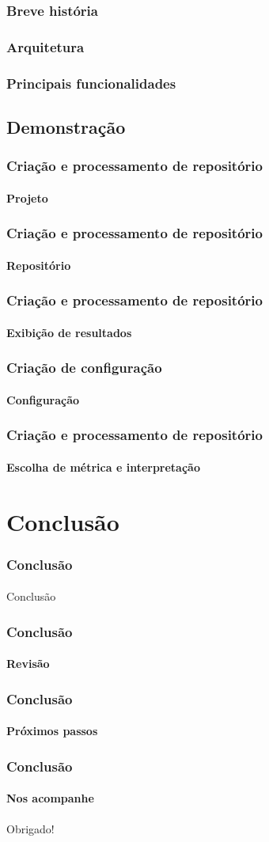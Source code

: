 \documentclass{beamer}
\begin{document}
\begin{frame}
  \frametitle{Breve história}
  \framesubtitle{}
\end{frame}

\begin{frame}
  \frametitle{Arquitetura}
  \framesubtitle{}
\end{frame}

\begin{frame}
  \frametitle{Principais funcionalidades}
  \framesubtitle{}
\end{frame}

  \subsection{Demonstração}
  \begin{frame}
    \frametitle{Criação e processamento de repositório}
    \framesubtitle{Projeto}
  \end{frame}

  \begin{frame}
    \frametitle{Criação e processamento de repositório}
    \framesubtitle{Repositório}
  \end{frame}

  \begin{frame}
    \frametitle{Criação e processamento de repositório}
    \framesubtitle{Exibição de resultados}
  \end{frame}

  \begin{frame}
    \frametitle{Criação de configuração}
    \framesubtitle{Configuração}
  \end{frame}

  \begin{frame}
    \frametitle{Criação e processamento de repositório}
    \framesubtitle{Escolha de métrica e interpretação}
  \end{frame}

\section{Conclusão}
\begin{frame}
  \frametitle{Conclusão}
  \framesubtitle{}

  Conclusão
\end{frame}

\begin{frame}
  \frametitle{Conclusão}
  \framesubtitle{Revisão}
\end{frame}

\begin{frame}
  \frametitle{Conclusão}
  \framesubtitle{Próximos passos}
\end{frame}

\begin{frame}
  \frametitle{Conclusão}
  \framesubtitle{Nos acompanhe}

  Obrigado!
\end{frame}
\end{document}
